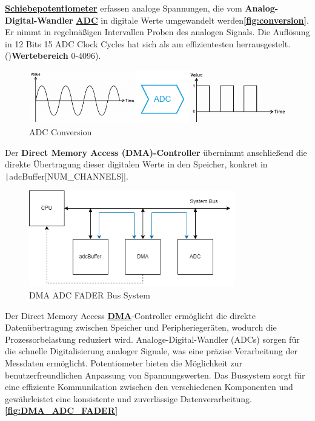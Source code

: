 \textbf{\hyperlink{Potentiometer}{Schiebepotentiometer}} erfassen analoge Spannungen, die vom \textbf{Analog-Digital-Wandler} \textbf{\hyperlink{ADC}{ADC}} in digitale Werte umgewandelt werden\textbf{\autoref{fig:conversion}}. Er nimmt in regelmäßigen Intervallen Proben des analogen Signals. Die Auflösung in 12 Bits 15 ADC Clock Cycles hat sich als am effizientesten herrausgestelt. ()\textbf{Wertebereich} 0-4096).

\begin{figure}[H]
	\centering
	\includegraphics[width=1.0\textwidth]{images/08_durchfuehrung/interface/Conversion.drawio.png}
	\caption{ADC Conversion}
	\label{fig:conversion}
\end{figure}

Der \textbf{Direct Memory Access (DMA)-Controller} übernimmt anschließend die direkte Übertragung dieser digitalen Werte in den Speicher, konkret in  \texttt|adcBuffer[NUM_CHANNELS]|.

\begin{figure}[H]
\centering
\includegraphics[width=0.8\textwidth]{images/08_durchfuehrung/interface/DMA_ADC_MEM.drawio.png}
\caption{DMA ADC FADER Bus System}
\label{fig:DMA_ADC_FADER}
\end{figure}

Der Direct Memory Access \textbf{\hyperlink{DMA}{DMA}}-Controller ermöglicht die direkte Datenübertragung zwischen Speicher und Peripheriegeräten, wodurch die Prozessorbelastung reduziert wird. Analoge-Digital-Wandler (ADCs) sorgen für die schnelle Digitalisierung analoger Signale, was eine präzise Verarbeitung der Messdaten ermöglicht. Potentiometer bieten die Möglichkeit zur benutzerfreundlichen Anpassung von Spannungswerten. Das Bussystem sorgt für eine effiziente Kommunikation zwischen den verschiedenen Komponenten und gewährleistet eine konsistente und zuverlässige Datenverarbeitung. \textbf{\autoref{fig:DMA_ADC_FADER}}\cite{dma-adc-work} \\

